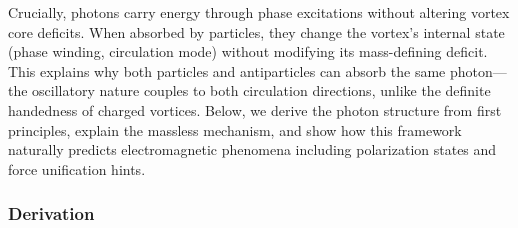 Crucially, photons carry energy through phase excitations without altering vortex core deficits. When absorbed by particles, they change the vortex's internal state (phase winding, circulation mode) without modifying its mass-defining deficit. This explains why both particles and antiparticles can absorb the same photon---the oscillatory nature couples to both circulation directions, unlike the definite handedness of charged vortices. Below, we derive the photon structure from first principles, explain the massless mechanism, and show how this framework naturally predicts electromagnetic phenomena including polarization states and force unification hints.

\subsubsection{Derivation}

